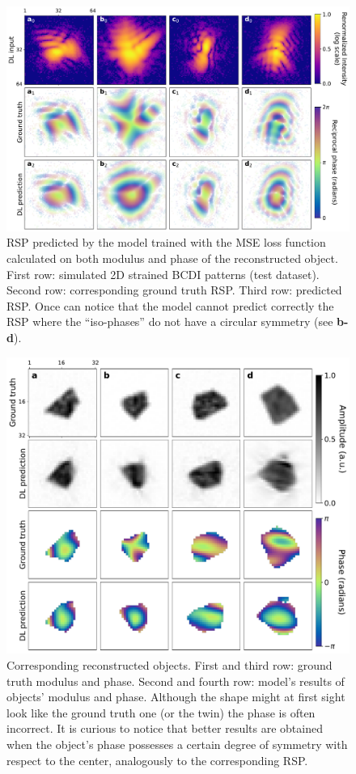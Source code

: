 \begin{figure}[H]
    \centering
    \includegraphics[width=\textwidth]{figures/Phasing/2D_hs_MSE_RSP.pdf}
    \caption{RSP predicted by the model trained with the MSE loss function calculated on both modulus and phase of the 
    reconstructed object. First row: simulated 2D strained BCDI patterns (test dataset). Second row: 
    corresponding ground truth RSP. Third row: predicted RSP. Once can notice that the model cannot predict correctly the 
    RSP where the ``iso-phases'' do not have a circular symmetry (see \textbf{b-d}).} 
    \label{fig:2D_hs_MSE_RSP}
\end{figure}

\begin{figure}[H]
    \centering
    \includegraphics[width=\textwidth]{figures/Phasing/2D_hs_MSE_obj.pdf}
    \caption{Corresponding reconstructed objects. First and third row: ground truth modulus and phase. Second and fourth row: 
    model's results of objects' modulus and phase. Although the shape might at first sight look like the ground truth one (or 
    the twin) the phase is often incorrect. It is curious to notice that better results are obtained when the object's 
    phase possesses a certain degree of symmetry with respect to the center, analogously to the corresponding RSP. } 
    \label{fig:2D_hs_MSE_obj}
\end{figure}

